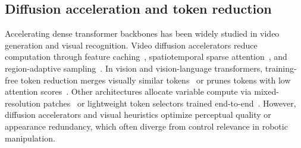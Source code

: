 


\subsection{Diffusion acceleration and token reduction}
\label{sec:related_future}
    Accelerating dense transformer backbones has been widely studied in video generation and visual recognition.
    Video diffusion accelerators reduce computation through feature caching~\cite{liu2025teacache,zhao2025pab}, spatiotemporal sparse attention~\cite{xi2025sparsevideogen}, and region-adaptive sampling~\cite{liu2026ras}.
    In vision and vision-language transformers, training-free token reduction merges visually similar tokens~\cite{bolya2023tome,bolya2023tomesd,li2024vidtome,hyun2025sttm} or prunes tokens with low attention scores~\cite{liang2022evit,chen2024fastv,zhang2025sparsevlm}.
    Other architectures allocate variable compute via mixed-resolution patches~\cite{ronen2023mixedres} or lightweight token selectors trained end-to-end~\cite{ryoo2021tokenlearner,rao2021dynamicvit,raposo2024mod}.
    However, diffusion accelerators and visual heuristics optimize perceptual quality or appearance redundancy, which often diverge from control relevance in robotic manipulation.
    

